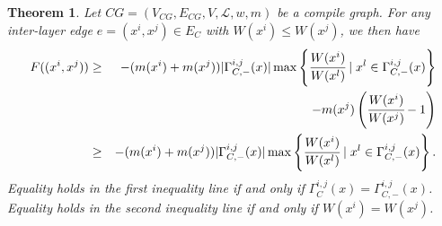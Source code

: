 \documentclass[10pt,a4paper]{amsart}
\newtheorem{theorem}{Theorem}
\begin{document}
\begin{theorem}
\label{lower}
    Let $CG = (V_{CG}, E_{CG}, V, \mathcal{L}, w, m)$ be a compile graph. 
    For any inter-layer edge $e =(x^i, x^j) \in E_C$ with $W(x^i) \leq W(x^j)$, we then have
    \begin{eqnarray}
    \label{Formanvalue}
        F((x^i,x^j)) 
        &\geq& -(m(x^i)+m(x^j)) |\Gamma^{i,j}_{C,-} (x)|\max \left\{ \cfrac{W(x^i)}{W(x^l)} \mid x^l \in \Gamma^{i,j}_{C,-}(x)\right\} \nonumber\\
        &\ & - m(x^j)\left(\cfrac{W(x^i)}{W(x^j)} -1 \right)\\
        &\geq& -(m(x^i)+m(x^j)) |\Gamma^{i,j}_{C,-} (x)|\max \left\{ \cfrac{W(x^i)}{W(x^l)} \mid x^l \in \Gamma^{i,j}_{C,-} (x)\right\}.
    \end{eqnarray}
    Equality holds in the first inequality line if and only if $\Gamma^{i,j}_C (x)= \Gamma^{i,j}_{C,-}(x)$. Equality holds in the second inequality line if and only if $W(x^i) = W(x^j)$.
\end{theorem}
\end{document}
